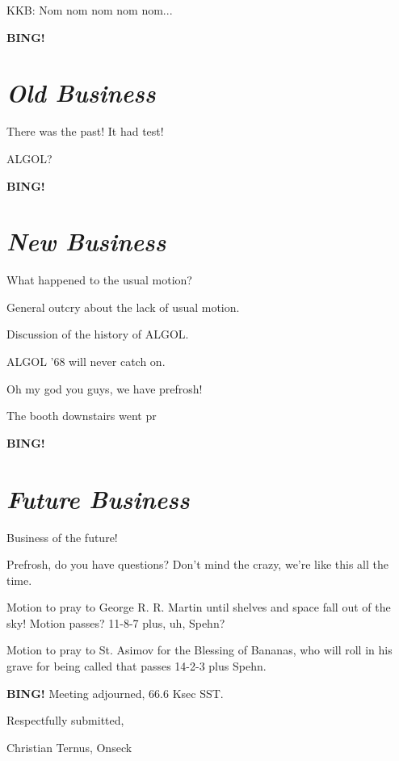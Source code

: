 \documentclass[10pt]{article}
\newcommand{\bing}{{\bf BING!} }
\newcommand{\goto}[1]{\bing \vskip 12pt \section*{{\em{#1}}}}
\newcommand{\ps}{ plus Spehn\xspace}
\begin{document}
KKB: Nom nom nom nom nom...

\goto{Old Business}

There was the past!  It had test!

ALGOL?

\goto{New Business}

What happened to the usual motion?

General outcry about the lack of usual motion.

Discussion of the history of ALGOL.

ALGOL '68 will never catch on.

Oh my god you guys, we have prefrosh!

The booth downstairs went pr

\goto{Future Business}

Business of the future!

Prefrosh, do you have questions?  Don't mind the crazy, we're like
this all the time.

Motion to pray to George R. R. Martin until shelves and space fall out of the sky!  Motion passes?  11-8-7 plus, uh, Spehn?

Motion to pray to St. Asimov for the Blessing of Bananas, who will roll in his grave for being called that passes 14-2-3\ps.

\bing
\noindent
Meeting adjourned, 66.6 Ksec SST.

\vspace{18pt}

\centerline{Respectfully submitted,}
\centerline{Christian Ternus, Onseck}
\end{document}
